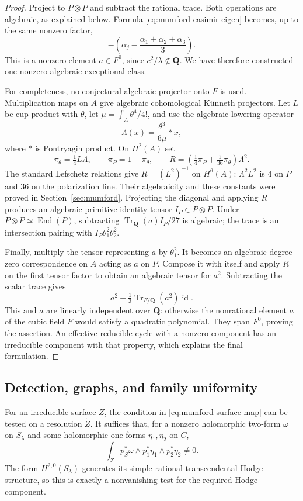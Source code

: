 \documentclass[11pt]{article}
\theoremstyle{definition}
\theoremstyle{remark}
\begin{document}
\begin{proof}
Project to $P\otimes P$ and subtract the rational trace.  Both operations
are algebraic, as explained below.  Formula
\eqref{eq:mumford-casimir-eigen} becomes, up to the same nonzero factor,
\[
 -\left(\alpha_j-
      \frac{\alpha_1+\alpha_2+\alpha_3}{3}\right).
\]
This is a nonzero element $a\in F^0$, since $c^2/\lambda\notin\mathbf Q$.
We have therefore constructed one nonzero algebraic exceptional class.

For completeness, no conjectural algebraic projector onto $F$ is used.
Multiplication maps on $A$ give algebraic cohomological K\"unneth
projectors.  Let $L$ be cup product with $\theta$, let
$\mu=\int_A\theta^4/4!$, and use the algebraic lowering operator
\[
 \Lambda(x)=\frac{\theta^3}{6\mu}*x,
\]
where $*$ is Pontryagin product.  On $H^2(A)$ set
\[
 \pi_\theta=\tfrac14L\Lambda,
 \qquad \pi_P=1-\pi_\theta,
 \qquad
 R=\left(\tfrac14\pi_P+\tfrac1{36}\pi_\theta\right)\Lambda^2.
\]
The standard Lefschetz relations give $R=(L^2)^{-1}$ on $H^6(A)$:
$\Lambda^2L^2$ is $4$ on $P$ and $36$ on the polarization line.
Their algebraicity and these constants were proved in Section~\ref{sec:mumford}. Projecting the diagonal and applying $R$
produces an algebraic primitive identity tensor $I_P\in P\otimes P$.
Under $P\otimes P\simeq\operatorname{End}(P)$, subtracting
$\operatorname{Tr}_{\mathbf Q}(a)I_P/27$ is algebraic; the trace is
an intersection pairing with $I_P\theta_1^2\theta_2^2$.

Finally, multiply the tensor representing $a$ by $\theta_1^2$.
It becomes an algebraic degree-zero correspondence on $A$ acting as $a$
on $P$.  Compose it with itself and apply $R$ on the first tensor factor
to obtain an algebraic tensor for $a^2$.  Subtracting the scalar trace
gives
\[
 a^2-\tfrac13\operatorname{Tr}_{F/\mathbf Q}(a^2)\operatorname{id}.
\]
This and $a$ are linearly independent over $\mathbf Q$: otherwise the
nonrational element $a$ of the cubic field $F$ would satisfy a quadratic
polynomial.  They span $F^0$, proving the assertion.  An effective
reducible cycle with a nonzero component has an irreducible component
with that property, which explains the final formulation.
\end{proof}

\subsection{Detection, graphs, and family uniformity}

For an irreducible surface $Z$, the condition in
\eqref{eq:mumford-surface-map} can be tested on a resolution
$\widetilde Z$.  It suffices that, for a nonzero holomorphic two-form
$\omega$ on $S_\lambda$ and some holomorphic one-forms $\eta_1,\eta_2$
on $C$,
\[
 \int_{\widetilde Z}p_S^*\omega\wedge
       \overline{p_1^*\eta_1\wedge p_2^*\eta_2}\ne0.
\]
The form $H^{2,0}(S_\lambda)$ generates its simple rational
transcendental Hodge structure, so this is exactly a nonvanishing test
for the required Hodge component.
\end{document}
